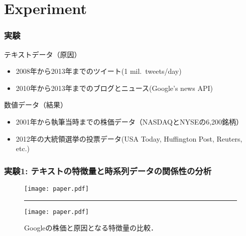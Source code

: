 \documentclass[12pt,noamssymb,usepdftitle=false]{beamer}
\begin{document}
\section{Experiment}
\begin{frame}
    \frametitle{実験}

    テキストデータ（原因）
    \begin{itemize}
        \item 2008年から2013年までのツイート(1 mil.\ tweets/day)
        \item 2010年から2013年までのブログとニュース(Google's news API)
    \end{itemize}

    \bigskip

    数値データ（結果）
    \begin{itemize}
        \item 2001年から執筆当時までの株価データ（NASDAQとNYSEの6,200銘柄）
        \item 2012年の大統領選挙の投票データ(USA Today, Huffington Post, Reuters, etc.)
    \end{itemize}
\end{frame}

\begin{frame}
    \frametitle{実験1: テキストの特徴量と時系列データの関係性の分析}
    \begin{figure}
        \centering
        \texttt{[image: paper.pdf]}

        \hrule

        \texttt{[image: paper.pdf]}
        \caption{Googleの株価と原因となる特徴量の比較．}
    \end{figure}
\end{frame}
\end{document}
